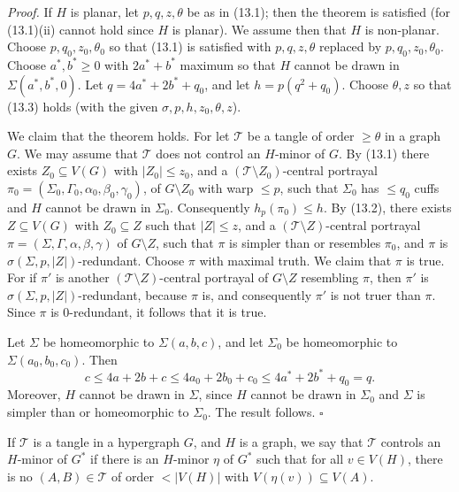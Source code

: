 \textit{Proof.} If $H$ is planar, let $p, q, z, \theta$ be as in (13.1); then the theorem is satisfied (for (13.1)(ii) cannot hold since $H$ is planar). We assume then that $H$ is non-planar. Choose $p, q_0, z_0, \theta_0$ so that (13.1) is satisfied with $p, q, z, \theta$ replaced by $p, q_0, z_0, \theta_0$. Choose $a^*, b^* \ge 0$ with $2a^* + b^*$ maximum so that $H$ cannot be drawn in $\Sigma(a^*, b^*, 0)$. Let $q = 4a^* + 2b^* + q_0$, and let $h = p(q^2 + q_0)$. Choose $\theta, z$ so that (13.3) holds (with the given $\sigma, p, h, z_0, \theta, z$).

We claim that the theorem holds. For let $\mathscr{T}$ be a tangle of order $\ge \theta$ in a graph $G$. We may assume that $\mathscr{T}$ does not control an $H$-minor of $G$. By (13.1) there exists $Z_0 \subseteq V(G)$ with $|Z_0| \le z_0$, and a $(\mathscr{T} \setminus Z_0)$-central portrayal $\pi_0 = (\Sigma_0, \Gamma_0, \alpha_0, \beta_0, \gamma_0)$, of $G \setminus Z_0$ with warp $\le p$, such that $\Sigma_0$ has $\le q_0$ cuffs and $H$ cannot be drawn in $\Sigma_0$. Consequently $h_p(\pi_0) \le h$. By (13.2), there exists $Z \subseteq V(G)$ with $Z_0 \subseteq Z$ such that $|Z| \le z$, and a $(\mathscr{T} \setminus Z)$-central portrayal $\pi = (\Sigma, \Gamma, \alpha, \beta, \gamma)$ of $G \setminus Z$, such that $\pi$ is simpler than or resembles $\pi_0$, and $\pi$ is $\sigma(\Sigma, p, |Z|)$-redundant. Choose $\pi$ with maximal truth. We claim that $\pi$ is true. For if $\pi'$ is another $(\mathscr{T} \setminus Z)$-central portrayal of $G \setminus Z$ resembling $\pi$, then $\pi'$ is $\sigma(\Sigma, p, |Z|)$-redundant, because $\pi$ is, and consequently $\pi'$ is not truer than $\pi$. Since $\pi$ is $0$-redundant, it follows that it is true.

Let $\Sigma$ be homeomorphic to $\Sigma(a, b, c)$, and let $\Sigma_0$ be homeomorphic to $\Sigma(a_0, b_0, c_0)$. Then
\begin{equation*}
c \le 4a + 2b + c \le 4a_0 + 2b_0 + c_0 \le 4a^* + 2b^* + q_0 = q.
\end{equation*}
Moreover, $H$ cannot be drawn in $\Sigma$, since $H$ cannot be drawn in $\Sigma_0$ and $\Sigma$ is simpler than or homeomorphic to $\Sigma_0$. The result follows. $\square$


If $\mathscr{T}$ is a tangle in a hypergraph $G$, and $H$ is a graph, we say that $\mathscr{T}$ controls an $H$-minor of $G^*$ if there is an $H$-minor $\eta$ of $G^*$ such that for all $v \in V(H)$, there is no $(A, B) \in \mathscr{T}$ of order $< |V(H)|$ with $V(\eta(v)) \subseteq V(A)$.

